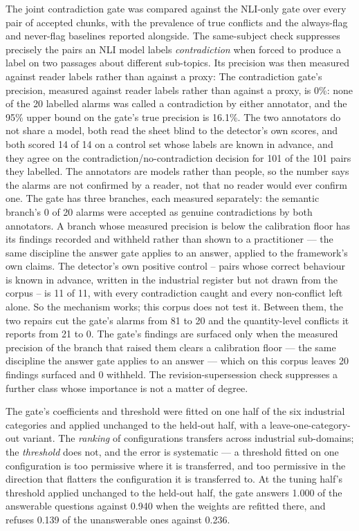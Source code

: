 \documentclass[preprint,3p,times]{elsarticle}
\begin{document}
The joint contradiction gate was compared against the NLI-only gate over every
pair of accepted chunks, with the prevalence of true conflicts and the
always-flag and never-flag baselines reported alongside. The same-subject check
suppresses precisely the pairs an NLI model labels \emph{contradiction} when
forced to produce a label on two passages about different sub-topics. Its
precision was then measured against reader labels rather than against a proxy:
The contradiction gate's precision, measured against reader labels rather than against a proxy, is 0\%: none of the 20 labelled alarms was called a contradiction by either annotator, and the 95\% upper bound on the gate's true precision is 16.1\%. The two annotators do not share a model, both read the sheet blind to the detector's own scores, and both scored 14 of 14 on a control set whose labels are known in advance, and they agree on the contradiction/no-contradiction decision for 101 of the 101 pairs they labelled. The annotators are models rather than people, so the number says the alarms are not confirmed by a reader, not that no reader would ever confirm one. The gate has three branches, each measured separately: the semantic branch's 0 of 20 alarms were accepted as genuine contradictions by both annotators. A branch whose measured precision is below the calibration floor has its findings recorded and withheld rather than shown to a practitioner — the same discipline the answer gate applies to an answer, applied to the framework's own claims. 
The detector's own positive control -- pairs whose correct behaviour is known in advance, written in the industrial register but not drawn from the corpus -- is 11 of 11, with every contradiction caught and every non-conflict left alone. So the mechanism works; this corpus does not test it. Between them, the two repairs cut the gate's alarms
from 81 to 20 and the
quantity-level conflicts it reports from 21 to 0. The
gate's findings are surfaced only when the
measured precision of the branch that raised them clears a calibration floor
--- the same discipline the answer gate applies to an answer --- which on this
corpus leaves 20 findings surfaced and 0
withheld. The
revision-supersession check suppresses a further class whose importance is not
a matter of degree.

The gate's coefficients and threshold were fitted on one half of the six
industrial categories and applied unchanged to the held-out half, with a
leave-one-category-out variant. The \emph{ranking} of configurations transfers
across industrial sub-domains; the \emph{threshold} does not, and the error is
systematic --- a threshold fitted on one configuration is too permissive where
it is transferred, and too permissive in the direction that flatters the
configuration it is transferred to. At the tuning half's threshold applied
unchanged to the held-out half, the gate answers
1.000 of the answerable questions against
0.940 when the weights are refitted there, and refuses
0.139 of the unanswerable ones against
0.236.
\end{document}

